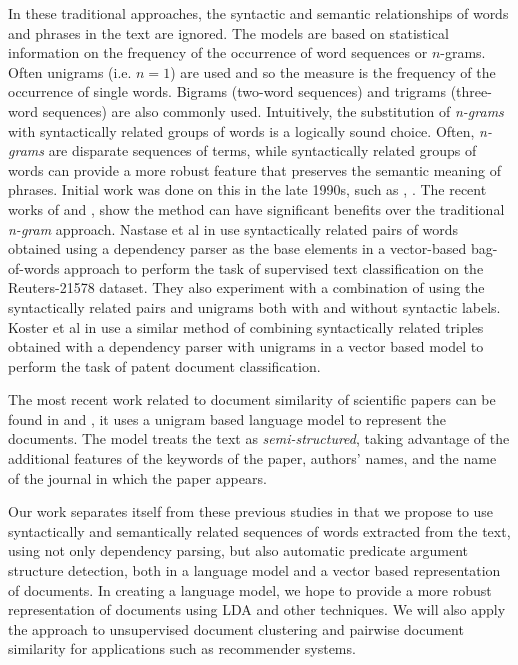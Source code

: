 \documentclass[11pt]{article}
\begin{document}
In these traditional approaches, the syntactic and semantic relationships of words and phrases in the text are ignored. The models are based on statistical information on the frequency of the occurrence of word sequences or $n$-grams. Often unigrams (i.e. $n=1$) are used and so the measure is the frequency of the occurrence of single words. Bigrams (two-word sequences) and trigrams (three-word sequences) are also commonly used. Intuitively, the substitution of \emph{n-grams} with syntactically related groups of words is a logically sound choice. Often, \emph{n-grams} are disparate sequences of terms, while syntactically related groups of words can provide a more robust feature that preserves the semantic meaning of phrases. Initial work was done on this in the late 1990s, such as \cite{Furnkranz1998}, \cite{Dumais1998}. The recent works of \cite{Nastase2007} and \cite{Koster2009}, show the method can have significant benefits over the traditional \emph{n-gram} approach. Nastase et al in \cite{Nastase2007} use syntactically related pairs of words obtained using a dependency parser as the base elements in a vector-based bag-of-words approach to perform the task of supervised text classification on the Reuters-21578 dataset. They also experiment with a combination of using the syntactically related pairs and unigrams both with and without syntactic labels. Koster et al in \cite{Koster2009} use a similar method of combining syntactically related triples obtained with a dependency parser with unigrams in a vector based model to perform the task of patent document classification.

The most recent work related to document similarity of scientific papers can be found in \cite{Hurtado2011} and \cite{Hurtado2013}, it uses a unigram based language model to represent the documents. The model treats the text as \emph{semi-structured}, taking advantage of the additional features of the keywords of the paper, authors' names, and the name of the journal in which the paper appears.

Our work separates itself from these previous studies in that we propose to use syntactically and semantically related sequences of words extracted from the text, using not only dependency parsing, but also automatic predicate argument structure detection, both in a language model and a vector based representation of documents. In creating a language model, we hope to provide a more robust representation of documents using LDA and other techniques. We will also apply the approach to unsupervised document clustering and pairwise document similarity for applications such as recommender systems. 
\end{document}
